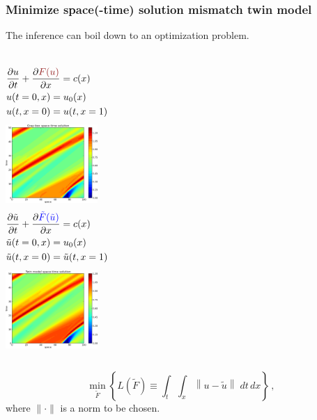 \documentclass{beamer}
\begin{document}
\begin{frame}
    \frametitle{Minimize space(-time) solution mismatch \hfill \scriptsize{twin model}}\small
    The inference can boil down to an optimization problem.
    \begin{columns}
        \begin{equation*}\begin{split}
            &\frac{\partial u}{\partial t}+ \frac{\partial \textcolor{darkred}{F(u)}}{\partial x} = c(x)\\
            &u(t=0,x) = u_0(x)\\
            &u(t,x=0) = u(t, x=1)
        \end{split}\end{equation*}
        \centering
        \includegraphics[width=3.5cm]{imag_1.png} 
        \begin{equation*}\begin{split}
            &\frac{\partial \tilde{u}}{\partial t}+ \frac{\partial {\textcolor{blue}{\tilde{F}
             (\tilde{u})}}}{\partial x} = c(x)\\
            &\tilde{u}(t=0,x) = u_0(x)\\
            &\tilde{u}(t,x=0) = \tilde{u}(t, x=1)
        \end{split}\end{equation*}
        \centering
        \includegraphics[width=3.5cm]{imag_2.png}
    \end{columns}
    \begin{center}
    $$
        \min_{\tilde{F}}\left\{ L(\tilde{F}) \equiv \int_t\int_x \left\|u-\tilde{u}\right\|\; dt\,dx\right\}\,,
    $$
    \scriptsize
    where $\|\cdot\|$ is a norm to be chosen.
    \end{center}
\end{frame}
\end{document}
